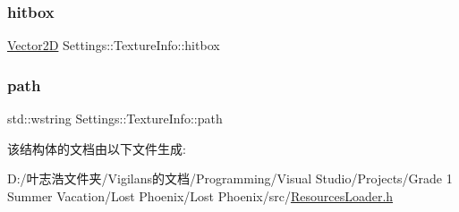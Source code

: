 \subsubsection{\texorpdfstring{hitbox}{hitbox}}
{\footnotesize\ttfamily \hyperlink{_vector2_d_8hpp_aa1f1145650f1dd9bddf7335ec6434d7c}{Vector2D} Settings\+::\+Texture\+Info\+::hitbox}

\mbox{\label{struct_settings_1_1_texture_info_ae8163d14505552c69b973a262fb896f6}} 
\subsubsection{\texorpdfstring{path}{path}}
{\footnotesize\ttfamily std\+::wstring Settings\+::\+Texture\+Info\+::path}



该结构体的文档由以下文件生成\+:\begin{DoxyCompactItemize}
\item 
D\+:/叶志浩文件夹/\+Vigilans的文档/\+Programming/\+Visual Studio/\+Projects/\+Grade 1 Summer Vacation/\+Lost Phoenix/\+Lost Phoenix/src/\hyperlink{_resources_loader_8h}{Resources\+Loader.\+h}\end{DoxyCompactItemize}
